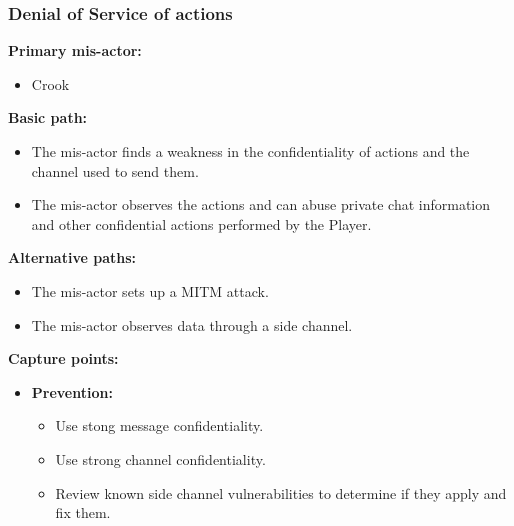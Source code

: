 \documentclass[a4paper,11pt]{report}
\begin{document}
\subsubsection{Denial of Service of actions}
\textbf{Primary mis-actor:}
\begin{itemize}
\item Crook
\end{itemize}
\textbf{Basic path:}
\begin{itemize}
\item The mis-actor finds a weakness in the confidentiality of actions and the channel used to send them.
\item The mis-actor observes the actions and can abuse private chat information and other confidential actions performed by the Player.
\end{itemize}
\textbf{Alternative paths:}
\begin{itemize}
\item The mis-actor sets up a MITM attack.
\item The mis-actor observes data through a side channel.
\end{itemize}
\textbf{Capture points:}
\begin{itemize}
\item \textbf{Prevention:}
\begin{itemize}
\item Use stong message confidentiality.
\item Use strong channel confidentiality.
\item Review known side channel vulnerabilities to determine if they apply and fix them.
\end{itemize}
\end{itemize}
\end{document}
